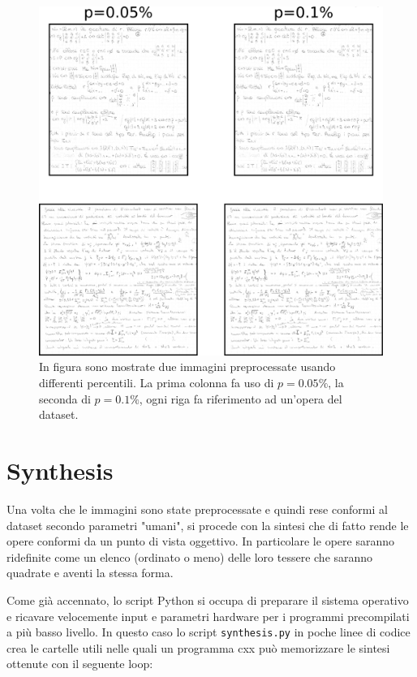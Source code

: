 \begin{toDo}
	\begin{figure}[h]
		\centering
		\includegraphics[width=1.0\linewidth]{Figures/fft_results.png}
		\caption[results of "fft cleaner"]{In figura sono mostrate due immagini preprocessate usando differenti percentili. La prima colonna fa uso di $p=0.05\%$, la seconda di $p=0.1\%$, ogni riga fa riferimento ad un'opera del dataset.}
		\label{fig:fft_results}
	\end{figure}

    \section{Synthesis}
    Una volta che le immagini sono state preprocessate e quindi rese conformi al dataset secondo parametri "umani", si procede con la sintesi che di fatto rende le opere conformi da un punto di vista oggettivo. In particolare le opere saranno ridefinite come un elenco (ordinato o meno) delle loro tessere che saranno quadrate e aventi la stessa forma.

    \noindent Come già accennato, lo script \gls{Python} si occupa di preparare il sistema operativo e ricavare velocemente input e parametri hardware per i programmi precompilati a più basso livello. In questo caso lo script \texttt{synthesis.py} in poche linee di codice crea le cartelle utili nelle quali un programma \gls{cxx} può memorizzare le sintesi ottenute con il seguente loop:


\end{toDo}
